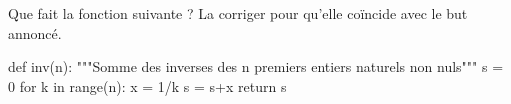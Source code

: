 \question Que fait la fonction suivante ? La corriger pour qu'elle coïncide avec le but annoncé. 

\begin{pyverbatim}
def inv(n):
    """Somme des inverses des n premiers entiers naturels non nuls"""
    s = 0
    for k in range(n):
        x = 1/k
    s = s+x
    return s
\end{pyverbatim}
